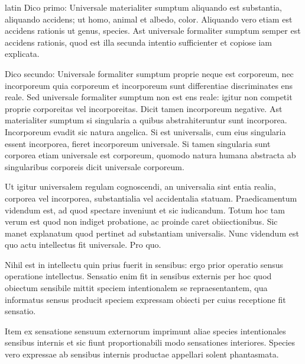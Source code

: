 \begin{otherlanguage*}{latin}
\pstart
  Dico primo: Universale materialiter sumptum aliquando est substantia, aliquando accidens; ut homo, animal et albedo, color. Aliquando vero etiam est accidens rationis ut genus, species. Ast universale formaliter sumptum semper est accidens rationis, quod est illa secunda intentio sufficienter et copiose iam explicata. 
\pend

\pstart
  Dico secundo: Universale formaliter sumptum proprie neque est corporeum, nec incorporeum quia corporeum et incorporeum sunt differentiae discriminates ens reale. Sed universale formaliter sumptum non est ens reale: igitur non competit proprie corporeitas vel incorporeitas. Dicit tamen incorporeum negative. Ast materialiter sumptum si singularia a quibus abstrahiteruntur sunt incorporea. Incorporeum evadit sic natura angelica. Si est universalis, cum eius singularia essent incorporea, fieret incorporeum universale. Si tamen singularia sunt corporea etiam universale est corporeum, quomodo natura humana abstracta ab singularibus corporeis dicit universale corporeum. 
\pend

\pstart
  Ut igitur universalem regulam cognoscendi, an universalia sint entia realia, corporea vel incorporea, substantialia vel accidentalia statuam. Praedicamentum videndum est, ad quod spectare inveniunt et sic iudicandum. Totum hoc tam verum est quod non indiget probatione, ac proinde caret obiiectionibus. Sic manet explanatum quod pertinet ad substantiam universalis. Nunc videndum est quo actu intellectus fit universale. Pro quo. 
\pend

        \pstart
        \pend
      
        \pstart
        \pend
      
\pstart
  Nihil est in intellectu quin prius fuerit in sensibus: ergo prior operatio sensus operatione intellectus. Sensatio enim fit in sensibus externis per hoc quod obiectum sensibile mittit speciem intentionalem se repraesentantem, qua informatus sensus producit speciem expressam obiecti per cuius receptione fit sensatio. 
\pend

\pstart
  Item ex sensatione sensuum externorum imprimunt aliae species intentionales sensibus internis et sic fiunt proportionabili modo sensationes interiores. Species vero expressae ab sensibus internis productae appellari solent phantasmata. 
\pend


\end{otherlanguage*}
